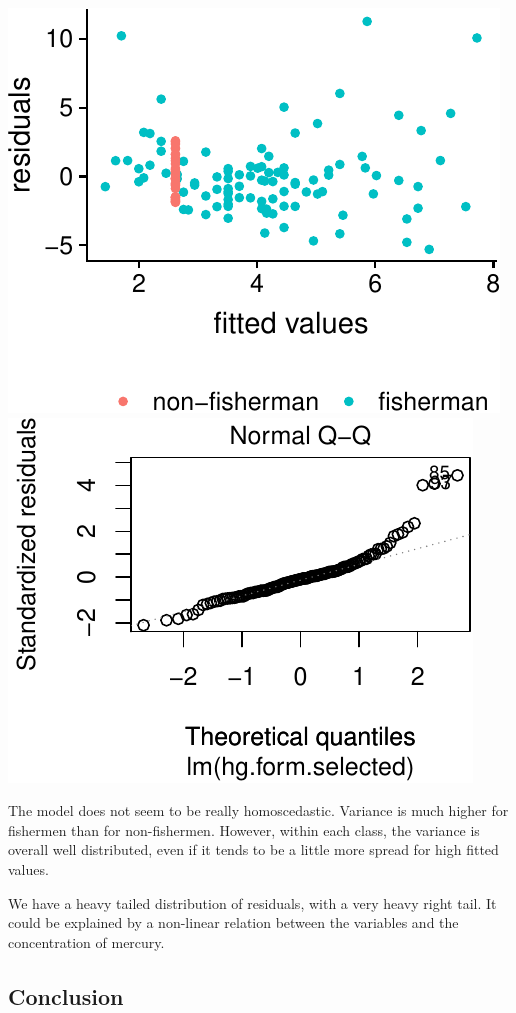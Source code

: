 \documentclass[12pt,]{article}
\begin{document}
\includegraphics{Report_files/figure-latex/unnamed-chunk-18-1.pdf}
\includegraphics{Report_files/figure-latex/unnamed-chunk-18-2.pdf}

The model does not seem to be really homoscedastic. Variance is much
higher for fishermen than for non-fishermen. However, within each class,
the variance is overall well distributed, even if it tends to be a
little more spread for high fitted values.

We have a heavy tailed distribution of residuals, with a very heavy
right tail. It could be explained by a non-linear relation between the
variables and the concentration of mercury.

\subsection{Conclusion}\label{conclusion}
\end{document}
